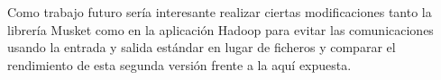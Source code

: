 \documentclass[conference]{IEEEtran}
\begin{document}
Como trabajo futuro sería interesante realizar ciertas modificaciones tanto la librería Musket como en la aplicación Hadoop para evitar las comunicaciones usando la entrada y salida estándar en lugar de ficheros y comparar el rendimiento de esta segunda versión frente a la aquí expuesta.\\




\end{document}
